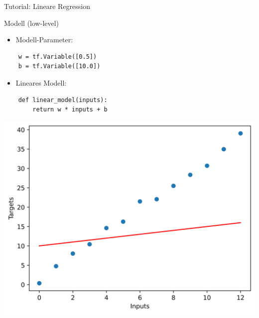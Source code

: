 \documentclass[utf8, smaller, c]{beamer}
\begin{document}
\begin{frame}{Tutorial: Lineare Regression}
	\begin{minipage}{0.4\textwidth}
	\begin{block}{Modell (low-level)}
	\begin{itemize}
		\item Modell-Parameter:
	\end{itemize}
	\begin{lstlisting}
	w = tf.Variable([0.5])
    b = tf.Variable([10.0])
	\end{lstlisting}
	\begin{itemize}
	 	\item Lineares Modell:
	 \end{itemize}
	\begin{lstlisting}
	def linear_model(inputs):
        return w * inputs + b
	\end{lstlisting}
	\end{block}
	\end{minipage}
	\begin{minipage}{0.58\textwidth}
	    \vspace*{5mm}
	    \centering
        \includegraphics[scale=0.38]{pics/lin_regression_model_initial.png}
	\end{minipage}
	
	\framebreak
	

\end{frame}
\end{document}
